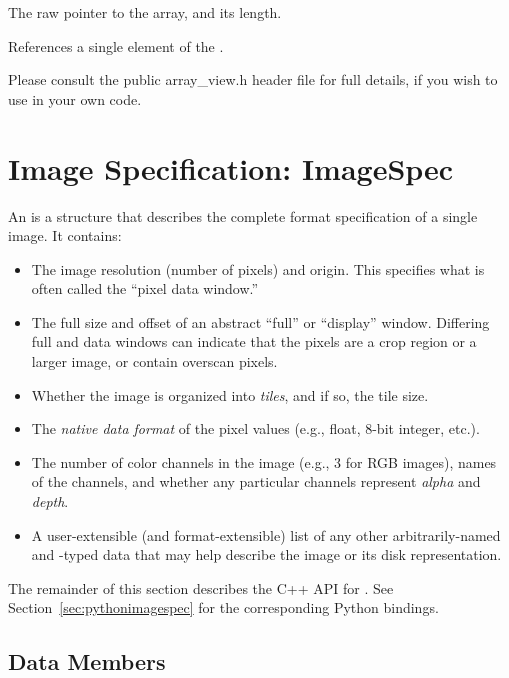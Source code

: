 The raw pointer to the array, and its length.
\apiend

References a single element of the \arrayview.
\apiend

\smallskip
\noindent Please consult the public {\cf array_view.h}
header file for full details, if you wish to use \arrayview in your own
code.




\section{Image Specification: {\cf ImageSpec}}
\label{sec:ImageSpec}

An \ImageSpec is a structure that describes the complete
format specification of a single image.  It contains:

\begin{itemize}
\item The image resolution (number of pixels) and origin. This specifies
  what is often called the ``pixel data window.''
\item The full size and offset of an abstract ``full'' or ``display''
  window. Differing full and data windows can indicate that the pixels
  are a crop region or a larger image, or contain overscan pixels.
\item Whether the image is organized into \emph{tiles}, and if so, the
  tile size.
\item The \emph{native data format} of the pixel values (e.g., float, 8-bit
  integer, etc.).
\item The number of color channels in the image (e.g., 3 for RGB
  images), names of the channels, and whether any particular channels
  represent \emph{alpha} and \emph{depth}.
\item A user-extensible (and format-extensible) list of any other
  arbitrarily-named and -typed data that may help describe the image or
  its disk representation.
\end{itemize}

The remainder of this section describes the C++ API for \ImageSpec.
See Section~\ref{sec:pythonimagespec} for the corresponding Python
bindings.

\subsection{\ImageSpec Data Members}

